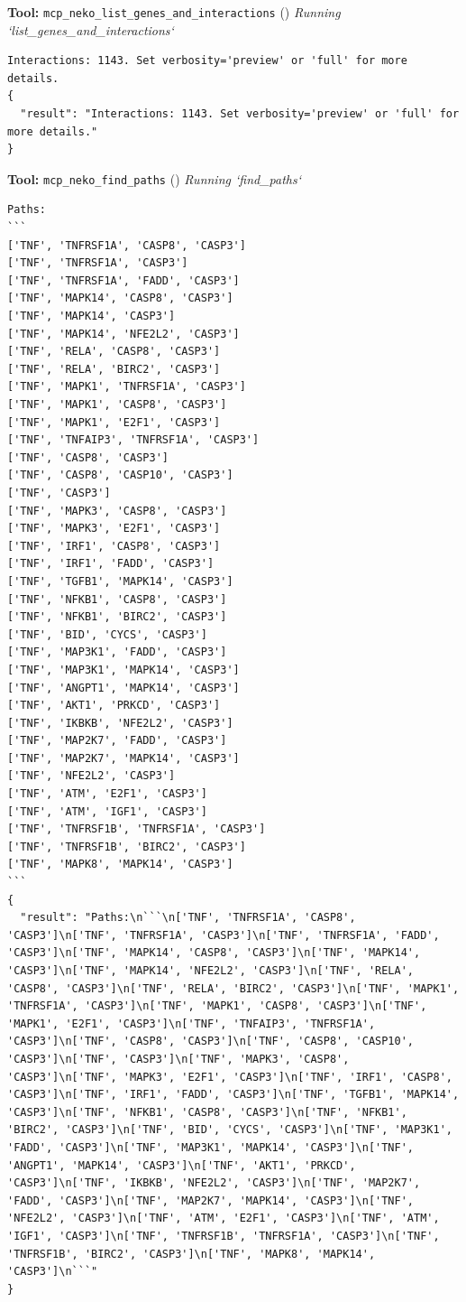 \documentclass[11pt,a4paper]{article}
\begin{document}
\begin{toolokbox}
\textbf{Tool:} \texttt{mcp\_neko\_list\_genes\_and\_interactions} (\checkmark)
\textit{Running `list\_genes\_and\_interactions`}
\begin{lstlisting}
Interactions: 1143. Set verbosity='preview' or 'full' for more details.
{
  "result": "Interactions: 1143. Set verbosity='preview' or 'full' for more details."
}
\end{lstlisting}
\end{toolokbox}
\begin{toolokbox}
\textbf{Tool:} \texttt{mcp\_neko\_find\_paths} (\checkmark)
\textit{Running `find\_paths`}
\begin{lstlisting}
Paths:
```
['TNF', 'TNFRSF1A', 'CASP8', 'CASP3']
['TNF', 'TNFRSF1A', 'CASP3']
['TNF', 'TNFRSF1A', 'FADD', 'CASP3']
['TNF', 'MAPK14', 'CASP8', 'CASP3']
['TNF', 'MAPK14', 'CASP3']
['TNF', 'MAPK14', 'NFE2L2', 'CASP3']
['TNF', 'RELA', 'CASP8', 'CASP3']
['TNF', 'RELA', 'BIRC2', 'CASP3']
['TNF', 'MAPK1', 'TNFRSF1A', 'CASP3']
['TNF', 'MAPK1', 'CASP8', 'CASP3']
['TNF', 'MAPK1', 'E2F1', 'CASP3']
['TNF', 'TNFAIP3', 'TNFRSF1A', 'CASP3']
['TNF', 'CASP8', 'CASP3']
['TNF', 'CASP8', 'CASP10', 'CASP3']
['TNF', 'CASP3']
['TNF', 'MAPK3', 'CASP8', 'CASP3']
['TNF', 'MAPK3', 'E2F1', 'CASP3']
['TNF', 'IRF1', 'CASP8', 'CASP3']
['TNF', 'IRF1', 'FADD', 'CASP3']
['TNF', 'TGFB1', 'MAPK14', 'CASP3']
['TNF', 'NFKB1', 'CASP8', 'CASP3']
['TNF', 'NFKB1', 'BIRC2', 'CASP3']
['TNF', 'BID', 'CYCS', 'CASP3']
['TNF', 'MAP3K1', 'FADD', 'CASP3']
['TNF', 'MAP3K1', 'MAPK14', 'CASP3']
['TNF', 'ANGPT1', 'MAPK14', 'CASP3']
['TNF', 'AKT1', 'PRKCD', 'CASP3']
['TNF', 'IKBKB', 'NFE2L2', 'CASP3']
['TNF', 'MAP2K7', 'FADD', 'CASP3']
['TNF', 'MAP2K7', 'MAPK14', 'CASP3']
['TNF', 'NFE2L2', 'CASP3']
['TNF', 'ATM', 'E2F1', 'CASP3']
['TNF', 'ATM', 'IGF1', 'CASP3']
['TNF', 'TNFRSF1B', 'TNFRSF1A', 'CASP3']
['TNF', 'TNFRSF1B', 'BIRC2', 'CASP3']
['TNF', 'MAPK8', 'MAPK14', 'CASP3']
```
{
  "result": "Paths:\n```\n['TNF', 'TNFRSF1A', 'CASP8', 'CASP3']\n['TNF', 'TNFRSF1A', 'CASP3']\n['TNF', 'TNFRSF1A', 'FADD', 'CASP3']\n['TNF', 'MAPK14', 'CASP8', 'CASP3']\n['TNF', 'MAPK14', 'CASP3']\n['TNF', 'MAPK14', 'NFE2L2', 'CASP3']\n['TNF', 'RELA', 'CASP8', 'CASP3']\n['TNF', 'RELA', 'BIRC2', 'CASP3']\n['TNF', 'MAPK1', 'TNFRSF1A', 'CASP3']\n['TNF', 'MAPK1', 'CASP8', 'CASP3']\n['TNF', 'MAPK1', 'E2F1', 'CASP3']\n['TNF', 'TNFAIP3', 'TNFRSF1A', 'CASP3']\n['TNF', 'CASP8', 'CASP3']\n['TNF', 'CASP8', 'CASP10', 'CASP3']\n['TNF', 'CASP3']\n['TNF', 'MAPK3', 'CASP8', 'CASP3']\n['TNF', 'MAPK3', 'E2F1', 'CASP3']\n['TNF', 'IRF1', 'CASP8', 'CASP3']\n['TNF', 'IRF1', 'FADD', 'CASP3']\n['TNF', 'TGFB1', 'MAPK14', 'CASP3']\n['TNF', 'NFKB1', 'CASP8', 'CASP3']\n['TNF', 'NFKB1', 'BIRC2', 'CASP3']\n['TNF', 'BID', 'CYCS', 'CASP3']\n['TNF', 'MAP3K1', 'FADD', 'CASP3']\n['TNF', 'MAP3K1', 'MAPK14', 'CASP3']\n['TNF', 'ANGPT1', 'MAPK14', 'CASP3']\n['TNF', 'AKT1', 'PRKCD', 'CASP3']\n['TNF', 'IKBKB', 'NFE2L2', 'CASP3']\n['TNF', 'MAP2K7', 'FADD', 'CASP3']\n['TNF', 'MAP2K7', 'MAPK14', 'CASP3']\n['TNF', 'NFE2L2', 'CASP3']\n['TNF', 'ATM', 'E2F1', 'CASP3']\n['TNF', 'ATM', 'IGF1', 'CASP3']\n['TNF', 'TNFRSF1B', 'TNFRSF1A', 'CASP3']\n['TNF', 'TNFRSF1B', 'BIRC2', 'CASP3']\n['TNF', 'MAPK8', 'MAPK14', 'CASP3']\n```"
}
\end{lstlisting}
\end{toolokbox}
\end{document}
